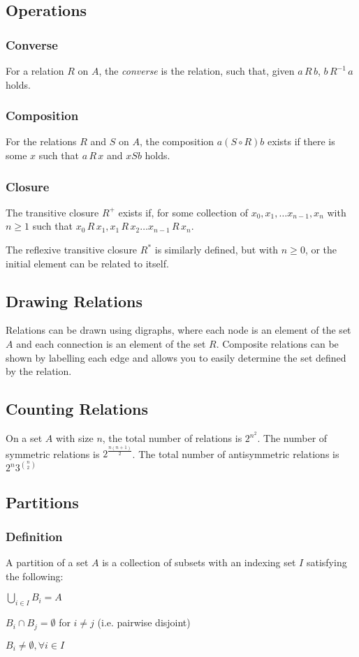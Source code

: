 \documentclass[10pt]{article}
\begin{document}
\subsection{Operations}
\subsubsection{Converse}
For a relation $R$ on $A$, the \emph{converse} is the relation, such that, given $a\,R\,b$, $b\,R^{-1}\,a$ holds.
\subsubsection{Composition}
For the relations $R$ and $S$ on $A$, the composition $a(S\circ R)b$ exists if there is some $x$ such that $a\,R\,x$ and $x S b$ holds.
\subsubsection{Closure}
The transitive closure $R^+$ exists if, for some collection of $x_0, x_1,\ldots x_{n-1},x_n$ with $n\ge1$ such that $x_0\,R\,x_1,x_1\,R\,x_2\ldots x_{n-1}\,R\,x_n$.

The reflexive transitive closure $R^*$ is similarly defined, but with $n\ge0$, or the initial element can be related to itself.
\subsection{Drawing Relations}
Relations can be drawn using digraphs, where each node is an element of the set $A$ and each connection is an element of the set $R$.  Composite relations can be shown by labelling each edge and allows you to easily determine the set defined by the relation.
\subsection{Counting Relations}
On a set $A$ with size $n$, the total number of relations is $2^{n^2}$.  The number of symmetric relations is $2^{\frac{n(n+1)}{2}}$.  The total number of antisymmetric relations is $2^n3^{\binom{n}{2}}$
\subsection{Partitions}
\subsubsection{Definition}
A partition of a set $A$ is a collection of subsets with an indexing set $I$ satisfying the following:
\begin{itemize*}
\item $\bigcup_{i\in I}B_i=A$
\item $B_i\cap B_j=\emptyset$ for $i\neq j$ (i.e. pairwise disjoint)
\item $B_i\neq\emptyset,\forall i\in I$ 
\end{itemize*}
\end{document}
